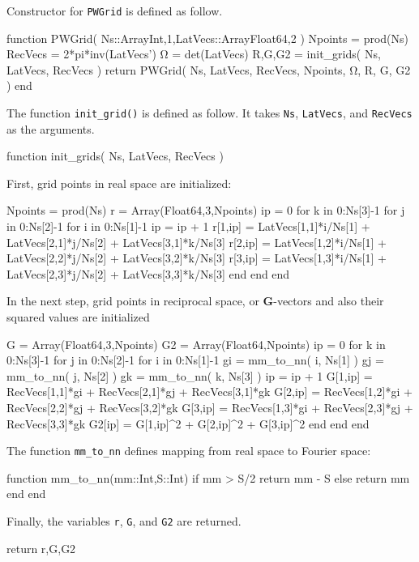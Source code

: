 \documentclass[a4paper,11pt]{extarticle}
\begin{document}
Constructor for {\tt PWGrid} is defined as follow.
\begin{juliacode}
function PWGrid( Ns::Array{Int,1},LatVecs::Array{Float64,2} )
  Npoints = prod(Ns)
  RecVecs = 2*pi*inv(LatVecs')
  Ω = det(LatVecs)
  R,G,G2 = init_grids( Ns, LatVecs, RecVecs )
  return PWGrid( Ns, LatVecs, RecVecs, Npoints, Ω, R, G, G2 )
end
\end{juliacode}

The function \verb|init_grid()| is defined as follow. It takes
\verb|Ns|, \verb|LatVecs|, and \verb|RecVecs| as the arguments.
\begin{juliacode}
function init_grids( Ns, LatVecs, RecVecs )
\end{juliacode}

First, grid points in real space are initialized:
\begin{juliacode}
  Npoints = prod(Ns)
  r = Array(Float64,3,Npoints)
  ip = 0
  for k in 0:Ns[3]-1
  for j in 0:Ns[2]-1
  for i in 0:Ns[1]-1
    ip = ip + 1
    r[1,ip] = LatVecs[1,1]*i/Ns[1] + LatVecs[2,1]*j/Ns[2]
              + LatVecs[3,1]*k/Ns[3]
    r[2,ip] = LatVecs[1,2]*i/Ns[1] + LatVecs[2,2]*j/Ns[2]
              + LatVecs[3,2]*k/Ns[3]
    r[3,ip] = LatVecs[1,3]*i/Ns[1] + LatVecs[2,3]*j/Ns[2]
              + LatVecs[3,3]*k/Ns[3]
  end
  end
  end
\end{juliacode}

In the next step, grid points in reciprocal space, or \textbf{G}-vectors
and also their squared values are initialized
\begin{juliacode}
  G  = Array(Float64,3,Npoints)
  G2 = Array(Float64,Npoints)
  ip    = 0
  for k in 0:Ns[3]-1
  for j in 0:Ns[2]-1
  for i in 0:Ns[1]-1
    gi = mm_to_nn( i, Ns[1] )
    gj = mm_to_nn( j, Ns[2] )
    gk = mm_to_nn( k, Ns[3] )
    ip = ip + 1
    G[1,ip] = RecVecs[1,1]*gi + RecVecs[2,1]*gj + RecVecs[3,1]*gk
    G[2,ip] = RecVecs[1,2]*gi + RecVecs[2,2]*gj + RecVecs[3,2]*gk
    G[3,ip] = RecVecs[1,3]*gi + RecVecs[2,3]*gj + RecVecs[3,3]*gk
    G2[ip] = G[1,ip]^2 + G[2,ip]^2 + G[3,ip]^2
  end
  end
  end
\end{juliacode}

The function {\tt mm\_to\_nn} defines mapping from real space to Fourier space:
\begin{juliacode}
function mm_to_nn(mm::Int,S::Int)
  if mm > S/2
    return mm - S
  else
    return mm
  end
end
\end{juliacode}

Finally, the variables \verb|r|, \verb|G|, and \verb|G2| are returned.
\begin{juliacode}
  return r,G,G2
\end{juliacode}
\end{document}
